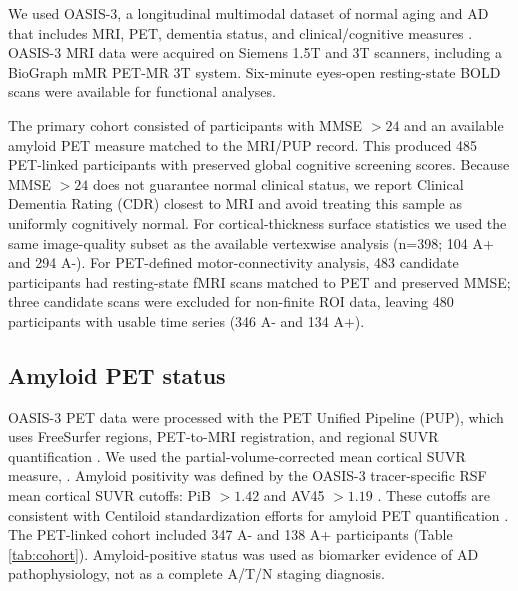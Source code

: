 \documentclass[review,3p,times,12pt,letterpaper]{elsarticle}
\begin{document}
We used OASIS-3, a longitudinal multimodal dataset of normal aging and AD that includes MRI, PET, dementia status, and clinical/cognitive measures \cite{lamontagne2019oasis}. OASIS-3 MRI data were acquired on Siemens 1.5T and 3T scanners, including a BioGraph mMR PET-MR 3T system. Six-minute eyes-open resting-state BOLD scans were available for functional analyses.

The primary cohort consisted of participants with MMSE $>24$ and an available amyloid PET measure matched to the MRI/PUP record. This produced 485 PET-linked participants with preserved global cognitive screening scores. Because MMSE $>24$ does not guarantee normal clinical status, we report Clinical Dementia Rating (CDR) closest to MRI and avoid treating this sample as uniformly cognitively normal. For cortical-thickness surface statistics we used the same image-quality subset as the available vertexwise analysis (n=398; 104 A+ and 294 A-). For PET-defined motor-connectivity analysis, 483 candidate participants had resting-state fMRI scans matched to PET and preserved MMSE; three candidate scans were excluded for non-finite ROI data, leaving 480 participants with usable time series (346 A- and 134 A+).

\subsection{Amyloid PET status}

OASIS-3 PET data were processed with the PET Unified Pipeline (PUP), which uses FreeSurfer regions, PET-to-MRI registration, and regional SUVR quantification \cite{oasis3_data_dictionary_2018,su_quantitative_2013}. We used the partial-volume-corrected mean cortical SUVR measure, . Amyloid positivity was defined by the OASIS-3 tracer-specific RSF mean cortical SUVR cutoffs: PiB $>1.42$ and AV45 $>1.19$ \cite{oasis3_data_dictionary_2018}. These cutoffs are consistent with Centiloid standardization efforts for amyloid PET quantification \cite{klunk_centiloid_2015}. The PET-linked cohort included 347 A- and 138 A+ participants (Table \ref{tab:cohort}). Amyloid-positive status was used as biomarker evidence of AD pathophysiology, not as a complete A/T/N staging diagnosis.
\end{document}
